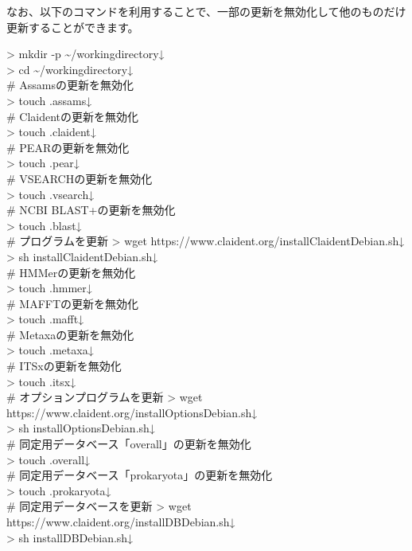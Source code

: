 \documentclass[titlepage,10pt,a4paper]{jsbook}
\newenvironment{cmd}{\begin{oframed}\raggedright\ttfamily\footnotesize\setlength{\baselineskip}{1.4em}}{\end{oframed}\vspace{-1em}}
\begin{document}
なお、以下のコマンドを利用することで、一部の更新を無効化して他のものだけ更新することができます。
\begin{cmd}
{\textgreater} mkdir -p {\textasciitilde}/workingdirectory↓\\
{\textgreater} cd {\textasciitilde}/workingdirectory↓\\
\# Assamsの更新を無効化\\
{\textgreater} touch .assams↓\\
\# Claidentの更新を無効化\\
{\textgreater} touch .claident↓\\
\# PEARの更新を無効化\\
{\textgreater} touch .pear↓\\
\# VSEARCHの更新を無効化\\
{\textgreater} touch .vsearch↓\\
\# NCBI BLAST+の更新を無効化\\
{\textgreater} touch .blast↓\\
\# プログラムを更新
{\textgreater} wget https://www.claident.org/installClaident{\textunderscore}Debian.sh↓\\
{\textgreater} sh installClaident{\textunderscore}Debian.sh↓\\
\# HMMerの更新を無効化\\
{\textgreater} touch .hmmer↓\\
\# MAFFTの更新を無効化\\
{\textgreater} touch .mafft↓\\
\# Metaxaの更新を無効化\\
{\textgreater} touch .metaxa↓\\
\# ITSxの更新を無効化\\
{\textgreater} touch .itsx↓\\
\# オプションプログラムを更新
{\textgreater} wget https://www.claident.org/installOptions{\textunderscore}Debian.sh↓\\
{\textgreater} sh installOptions{\textunderscore}Debian.sh↓\\
\# 同定用データベース「overall」の更新を無効化\\
{\textgreater} touch .overall↓\\
\# 同定用データベース「prokaryota」の更新を無効化\\
{\textgreater} touch .prokaryota↓\\
\# 同定用データベースを更新
{\textgreater} wget https://www.claident.org/installDB{\textunderscore}Debian.sh↓\\
{\textgreater} sh installDB{\textunderscore}Debian.sh↓\\

\end{cmd}
\end{document}
